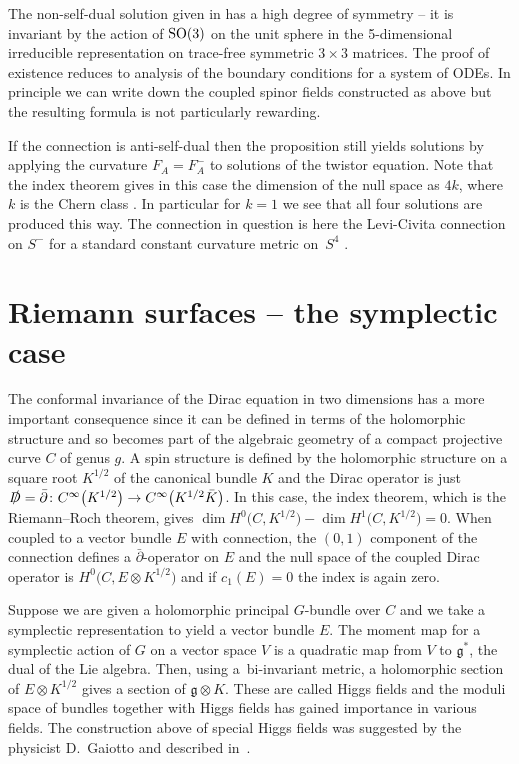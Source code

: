\documentclass[pdftex]{sigma}
\newcommand{\lie}[1]{\mathfrak{#1}}
\begin{document}
\begin{remark}
 The non-self-dual solution given in \cite{SadunL/SegertJ} has a high degree of symmetry -- it is invariant by the action of ${\rm SO}(3)$ on the unit sphere in the 5-dimensional irreducible representation on trace-free symmetric $3\times 3$ matrices. The proof of existence reduces to analysis of the boundary conditions for a system of ODEs. In principle we can write down the coupled spinor fields constructed as above but the resulting formula is not particularly rewarding.
\end{remark}
\begin{remark}
 If the connection is anti-self-dual then the proposition still yields solutions by applying the curvature $F_A=F_A^-$ to solutions of the twistor equation. Note that the index theorem gives in this case the dimension of the null space as $4k$, where $k$ is the Chern class \cite[Section~10]{AtiyahM/HitchinN/SingerI}. In particular for $k=1$ we see that all four solutions are produced this way. The connection in question is here the Levi-Civita connection on $S^-$ for a standard constant curvature metric on~$S^4$ .
\end{remark}

\section{Riemann surfaces -- the symplectic case}\label{section3}
The conformal invariance of the Dirac equation in two dimensions has a more important consequence since it can be defined in terms of the holomorphic structure and so becomes part of the algebraic geometry of a compact projective curve $C$ of genus $g$. A spin structure is defined by the holomorphic structure on a square root $K^{1/2}$ of the canonical bundle $K$ and the Dirac operator is just $\slashed D=\bar\partial\colon C^{\infty}\big(K^{1/2}\big)\rightarrow C^{\infty}\big(K^{1/2}\bar K\big)$.
In this case, the index theorem, which is the Riemann--Roch theorem, gives $\dim H^0\big(C,K^{1/2}\big)-\dim H^1\big(C, K^{1/2}\big)=0$.
When coupled to a vector bundle $E$ with connection, the $(0,1)$ component of the connection defines a $\bar\partial$-operator on $E$ and the null space of the coupled Dirac operator is $H^0\big(C,E\otimes K^{1/2}\big)$ and if $c_1(E)=0$ the index is again zero.

Suppose we are given a holomorphic principal $G$-bundle over $C$ and we take a symplectic representation to yield a vector bundle $E$. The moment map for a symplectic action of $G$ on a vector space $V$ is a quadratic map from $V$ to $\lie{g}^*$, the dual of the Lie algebra. Then, using a~bi-invariant metric, a holomorphic section of $E\otimes K^{1/2}$ gives a section of $\lie{g}\otimes K$. These are called Higgs fields and the moduli space of bundles together with Higgs fields has gained importance in various fields. The construction above of special Higgs fields was suggested by the physicist D.~Gaiotto \cite{Gaiotto} and described in~\cite{Hitchin2}.
\end{document}
